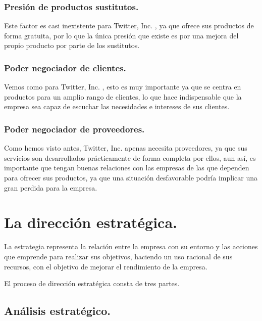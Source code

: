 \subsubsection{Presión de productos sustitutos.}

Este factor es casi inexistente para Twitter, Inc. , ya que ofrece sus productos de forma gratuita, por lo que la única presión que existe es por una mejora del propio producto por parte de los sustitutos.

\subsubsection{Poder negociador de clientes.}

Vemos como para Twitter, Inc. , esto es muy importante ya que se centra en productos para un amplio rango de clientes, lo que hace indispensable que la empresa sea capaz de escuchar las necesidades e intereses de sus clientes.

\subsubsection{Poder negociador de proveedores.}

Como hemos visto antes, Twitter, Inc. apenas necesita proveedores, ya que sus servicios son desarrollados prácticamente de forma completa por ellos, aun así, es importante que tengan buenas relaciones con las empresas de las que dependen para ofrecer sus productos, ya que una situación desfavorable podría implicar una gran perdida para la empresa.








\section{La dirección estratégica.}

La estrategia representa la relación entre la empresa con su entorno y las acciones que emprende para realizar sus objetivos, haciendo un uso racional de sus recursos, con el objetivo de mejorar el rendimiento de la empresa.

El proceso de dirección estratégica consta de tres partes.

\subsection{Análisis estratégico.}

